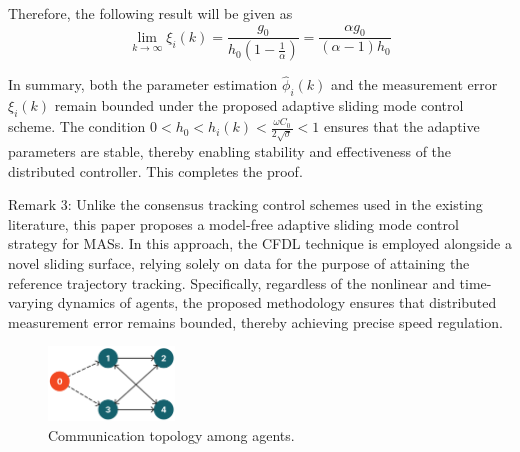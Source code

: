 \documentclass[journal,onecolumn]{IEEEtran}
\begin{document}
Therefore, the following result will be given as
\begin{equation}
    \label{model:lim_fin}
    \lim_{k \to \infty} \xi_i(k) = \frac{g_0}{h_0(1-\frac{1}{\alpha})} = \frac{\alpha g_0}{(\alpha-1)h_0}
\end{equation}

In summary, both the parameter estimation $\hat{\phi}_i(k)$ and the measurement error $\xi_i(k)$ remain bounded under the proposed adaptive sliding mode control scheme. The condition $0 < h_0 < h_i(k) < \frac{\omega C_0}{2\sqrt{\sigma}} < 1$ ensures that the adaptive parameters are stable, thereby enabling stability and effectiveness of the distributed controller. This completes the proof.


Remark 3: Unlike the consensus tracking control schemes used in the existing literature, this paper proposes a model-free adaptive sliding mode control strategy for MASs. In this approach, the CFDL technique is employed alongside a novel sliding surface, relying solely on data for the purpose of attaining the reference trajectory tracking. Specifically, regardless of the nonlinear and time-varying dynamics of agents, the proposed methodology ensures that distributed measurement error remains bounded, thereby achieving precise speed regulation.

\begin{figure}[H]
    \centering
    \includegraphics[width=0.3\textwidth]{communication.png}
    \caption{Communication topology among agents.}
    \label{fig:communication1} %
\end{figure}




\end{document}
